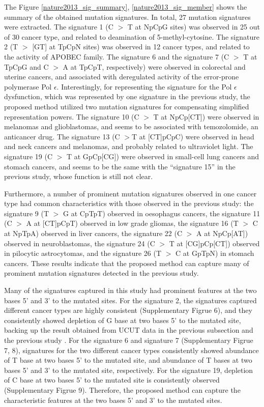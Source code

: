 The Figure \ref{nature2013_sig_summary},  \ref{nature2013_sig_member} shows the summary of the obtained mutation signatures.
In total, 27 mutation signatures were extracted.
The signature 1 (C $>$ T at NpCpG sites) was observed in 25 out of 30 cancer type, and related to deamination of 5-methyl-cytosine.
The signature 2 (T $>$ [GT] at TpCpN sites) was observed in 12 cancer types, and related to the activity of APOBEC family.
The signature 6 and the signature 7 (C $>$ T at TpCpG and C $>$ A at TpCpT, respectively) were observed in colorectal and uterine cancers,
and associated with deregulated activity of the error-prone polymerase Pol $\epsilon$.
Interestingly, for representing the signature for the Pol $\epsilon$ dysfunction, which was represented by one signature in the previous study,
the proposed method utilized two mutation signatures for compensating simplified representation powers.
The signature 10 (C $>$ T at NpCp[CT]) were observed in melanomas and glioblastomas, 
and seems to be associated with temozolomide, an anticancer drug.
The signature 13 (C $>$T at [CT]pCpC) were observed in head and neck cancers and melanomas, and probably related to ultraviolet light.
The signature 19 (C $>$ T at GpCp[CG]) were observed in small-cell lung cancers and stomach cancers,
and seems to be the same with the ``signature 15'' in the previous study, whose function is still not clear.


Furthermore, a number of prominent mutation signatures observed in one cancer type 
had common characteristics with those observed in the previous study:
the signature 9 (T $>$ G at CpTpT) observed in oesophagus cancers, 
the signature 11 (C $>$ A at [CT]pCpT) observed in low grade gliomas,
the signature 16 (T $>$ C at NpTpA) observed in liver cancers, 
the signature 22 (C $>$ A at NpCp[AT]) observed in neuroblastomas,
the signature 24 (C $>$ T at [CG]pCp[CT]) observed in pilocytic astrocytomas, 
and the signature 26 (T $>$ C at GpTpN) in stomach cancers.
These results indicate that the proposed method can capture 
many of prominent mutation signatures detected in the previous study.


Many of the signatures captured in this study 
had prominent features at the two bases 5' and 3' to the mutated sites.
For the signature 2, the signatures captured different cancer types are highly consistent (Supplementary Figrue 6),
and they consistently showed depletion of G base at two bases 5' to the mutated site,
backing up the result obtained from UCUT data in the previous subsection and the previous study  \cite{pmid23318258}.
For the signature 6 and signature 7 (Supplementary Figrue 7, 8), 
signatures for the two different cancer types consistently showed abundance of T base at two bases 5' to the mutated site,
and abundance of T bases at two bases 5' and 3' to the mutated site, respectively.
For the signature 19, depletion of C base at two bases 5' to the mutated site is consistently observed (Supplementary Figrue 9).
Therefore, the proposed method can capture the characteristic features at the two bases 5' and 3' to the mutated sites.



